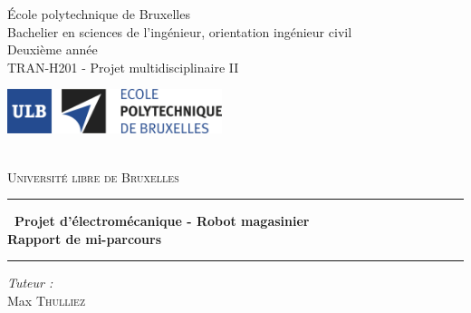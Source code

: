 \documentclass[a4paper,11pt]{article}
\newcommand{\hsp}{\hspace{20pt}}
\begin{document}
\begin{titlepage}
    \linespread{1}
    	\begin{center}
            \begin{framed}
              \parbox[c][13mm]{215pt}{
                \scriptsize\sf           École polytechnique de Bruxelles\\
                \scriptsize\sf           Bachelier en sciences de l'ingénieur, orientation ingénieur civil\\
                \scriptsize\sf           Deuxième année\\
                \scriptsize\sf           TRAN-H201 - Projet multidisciplinaire II
                }
                \hfill
              \parbox[c][13mm]{178.52396pt}{\includegraphics[height=13mm]{logo_EPB.jpg}}
            \end{framed}\\[1cm]
            
		
		\textsc{\Large Université libre de Bruxelles}\\[1.5cm]
		
		\hrule
		\begin{framed}{\Large\bfseries \ Projet d'électromécanique - Robot magasinier \\ \huge Rapport de mi-parcours}
		\end{framed}
		\hrule
		
		\vspace{12mm}
		
		\begin{minipage}[t]{0.6\textwidth}
			\begin{center} \large
			\emph{Tuteur :}            \\
			\vspace{2mm}
			Max \textsc{Thulliez}     \\
			\end{center}
		\end{minipage}
		
		\hsp
		

\end{center}
\end{titlepage}
\end{document}
